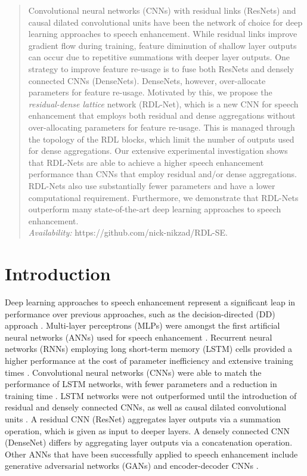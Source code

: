 \documentclass[letterpaper]{article} \usepackage{aaai20}  \usepackage{times}  \usepackage{helvet} \usepackage{courier}  \usepackage[hyphens]{url}  \usepackage{graphicx} \urlstyle{rm} \def\UrlFont{\rm}  \usepackage{graphicx}  \frenchspacing  \setlength{\pdfpagewidth}{8.5in}  \setlength{\pdfpageheight}{11in}
\author{
\Large \textbf{Mohammad Nikzad,\textsuperscript{\rm 1} Aaron Nicolson,\textsuperscript{\rm 1} Yongsheng Gao,\textsuperscript{\rm 1}}\\
\Large \textbf{Jun Zhou,\textsuperscript{\rm 1} Kuldip K. Paliwal,\textsuperscript{\rm 1} Fanhua Shang\textsuperscript{\rm 2}}\\
\textsuperscript{\rm 1}Institute for Integrated and Intelligent Systems, Griffith University, Australia\\ 
\textsuperscript{\rm 2} School of Artificial Intelligence, Xidian University, China\\m.nikzadehaji,  aaron.nicolson@griffithuni.edu.au, \\
yongsheng.gao, jun.zhou, k.paliwal@griffith.edu.au\\
 fhshang@xidian.edu.cn
}
\begin{document}
\maketitle

\begin{abstract}
Convolutional neural networks (CNNs) with residual links (ResNets) and causal dilated convolutional units have been the network of choice for deep learning approaches to speech enhancement. While residual links improve gradient flow during training, feature diminution of shallow layer outputs can occur due to repetitive summations with deeper layer outputs. One strategy to improve feature re-usage is to fuse both ResNets and densely connected CNNs (DenseNets). DenseNets, however, over-allocate parameters for feature re-usage. Motivated by this, we propose the \textit{residual-dense lattice} network (RDL-Net), which is a new CNN for speech enhancement that employs both residual and dense aggregations without over-allocating parameters for feature re-usage. This is managed through the topology of the RDL blocks, which limit the number of outputs used for dense aggregations. Our extensive experimental investigation shows that RDL-Nets are able to achieve a higher speech enhancement performance than CNNs that employ residual and/or dense aggregations. RDL-Nets also use substantially fewer parameters and have a lower
computational requirement. Furthermore, we demonstrate that RDL-Nets outperform many state-of-the-art deep learning approaches to speech enhancement.\\
\textit{Availability:} https://github.com/nick-nikzad/RDL-SE.

\end{abstract}

\section{Introduction}

Deep learning approaches to speech enhancement represent a significant leap in performance over previous approaches, such as the decision-directed (DD) approach \cite{1164453}. Multi-layer perceptrons (MLPs) were amongst the first artificial neural networks (ANNs) used for speech enhancement \cite{xu2017multi}. Recurrent neural networks (RNNs) employing long short-term memory (LSTM) cells provided a higher performance at the cost of parameter inefficiency and extensive training times \cite{chen2017long}. Convolutional neural networks (CNNs) were able to match the performance of LSTM networks, with fewer parameters and a reduction in training time \cite{Park2017}. LSTM networks were not outperformed until the introduction of residual \cite{he2016identity,wavenet} and densely connected \cite{huang_densely_2017,dense_SE} CNNs, as well as causal dilated convolutional units \cite{bai2018empirical}. A residual CNN (ResNet) aggregates layer outputs via a summation operation, which is given as input to deeper layers. A densely connected CNN (DenseNet) differs by aggregating layer outputs via a concatenation operation. Other ANNs that have been successfully applied to speech enhancement include generative adversarial networks (GANs) and encoder-decoder CNNs \cite{segan}.
\end{document}
